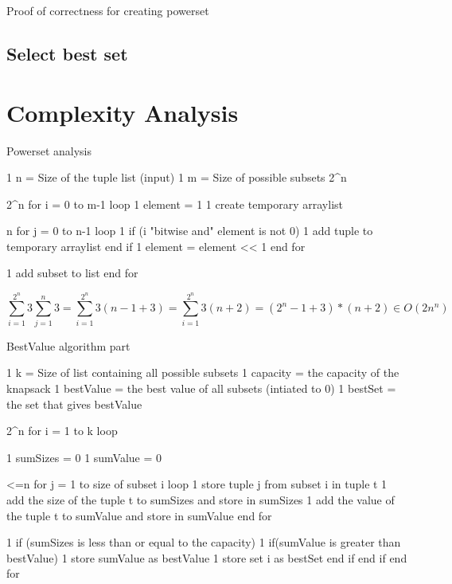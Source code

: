 \documentclass{inc/mas}
\begin{document}
Proof of correctness for creating powerset

\subsection{Select best set}

\section{Complexity Analysis}

Powerset analysis \\

\begin{verbatimtab}[4]
1		n = Size of the tuple list (input)
1		m = Size of possible subsets 2^n


2^n		for i = 0 to m-1 loop	
1			element = 1	
1			create temporary arraylist
	  
n			for j = 0 to n-1 loop	
1				if (i "bitwise and" element is not 0)
1					add tuple to temporary arraylist
				end if
1				element = element << 1
			end for
	
1		add subset to list
		end for
\end{verbatimtab}

\begin{equation}
\sum^{2^n}_{i =1}3\sum^n_{j=1}3= 
\sum^{2^n}_{i =1}3(n-1+3) = 
\sum^{2^n}_{i =1}3(n+2) = 
(2^n-1+3)*(n+2) \in O(2n^n)
\end{equation}


BestValue algorithm part\\

\begin{verbatimtab}[4]
1		k = Size of list containing all possible subsets
1		capacity = the capacity of the knapsack
1		bestValue = the best value of all subsets (intiated to 0)
1		bestSet = the set that gives bestValue

2^n		for i = 1 to k loop

1			sumSizes = 0
1			sumValue = 0

<=n			for j = 1 to size of subset i loop
1				store tuple j from subset i in tuple t
1				add the size of the tuple t to sumSizes and store in sumSizes
1				add the value of the tuple t to sumValue and store in sumValue
			end for

1			if (sumSizes is less than or equal to the capacity)
1				if(sumValue is greater than bestValue)
1					store sumValue as bestValue
1					store set i as bestSet
				end if
			end if
		end for
\end{verbatimtab}
\end{document}
